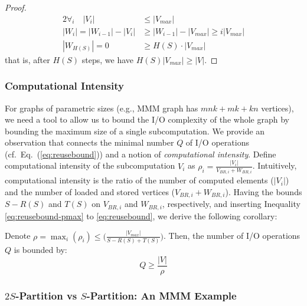 \begin{proof}
	\vspace{-0.5em}
	\begin{alignat}{2}
	\nonumber
	\forall_{i}\quad |V_i| & \le |V_{max}| \\
	\nonumber
	|W_i| = |W_{i-1}| - |V_i| & \ge |W_{i-1}| - |V_{max}| \ge i|V_{max}| \\
	\nonumber
	|W_{H(S)}| = 0 & \ge H(S) \cdot |V_{max}| 
	\end{alignat}
	\vspace{-0.5em}
	that is, after $H(S)$ steps, we have $H(S) |V_{max}| \ge |V|$.
\end{proof}



\subsubsection{Computational Intensity}
\label{sec:compIntensity}

For graphs of parametric sizes (e.g., MMM graph has $mnk + mk + kn$ vertices), 
we need a tool to allow us to bound the I/O complexity of the whole graph by 
bounding the maximum size of a single subcomputation. We provide an 
observation 
that connects the minimal 
number $Q$ of
I/O operations
(cf.~Eq.~(\ref{eq:reusebound})) and a notion
of \emph{computational intensity}.
%
Define computational intensity of the subcomputation $V_i$ as $\rho_i =
\frac{|V_i|}{V_{BR,i} + W_{BR,i}}$. Intuitively, computational intensity is 
the 
ratio of 
the number of computed elements ($|V_i|$) and the number of loaded and stored 
vertices ($V_{BR,i} + W_{BR,i}$). Having the bounds $S - R(S)$ and $T(S)$ on 
$V_{BR,i}$ and $W_{BR,i}$, respectively, and inserting Inequality 
\ref{eq:reusebound-pmax} to \ref{eq:reusebound}, we 
derive the following corollary:

\begin{corollary*}
	\label{cor:q}
	Denote $\rho = \max_i(\rho_i) \le \Big(\frac{|V_{max}|}{S-R(S) + 
		T(S)}\Big)$. Then, the number of I/O operations $Q$ is bounded by:
	\begin{equation}
	Q \ge \frac{|V|}{\rho}
	\end{equation} 
\end{corollary*}

\subsubsection{$2S$-Partition vs $S$-Partition: An MMM Example}


